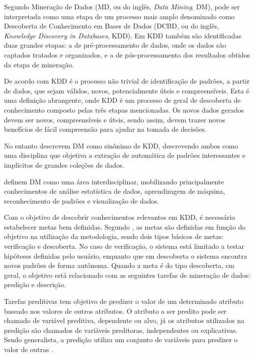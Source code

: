 Segundo  Mineração de Dados (MD, ou do inglês,
\textit{Data Mining}, DM), pode ser interpretada como uma etapa de um processo
mais amplo denominado como Descoberta de Conhecimento em Bases de Dados (DCBD,
ou do inglês, \textit{Knowledge Discovery in Databases}, KDD). Em KDD também são
identificadas duas grandes etapas: a de pré-processamento de dados, onde os
dados são captados tratados e organizados, e a de pós-processamento dos
resultados obtidos da etapa de mineração.

De acordo com  KDD é o processo não trivial de
identificação de padrões, a partir de dados, que sejam válidos, novos,
potencialmente úteis e compreensíveis. Esta é uma definição abrangente, onde KDD
é um processo de geral de descoberta de conhecimento composto pelas três etapas
mencionadas. Os novos dados gerados devem ser novos, compreensíveis e úteis,
sendo assim, devem trazer novos benefícios de fácil compreensão para ajudar na
tomada de decisões.

No entanto  descrevem DM como sinônimo de KDD,
descrevendo ambos como uma disciplina que objetiva a extração de automática de
padrões interessantes e implícitos de grandes coleções de dados.

 definem DM como uma área interdisciplinar,
mobilizando principalmente conhecimentos de análise estatística de dados,
aprendizagem de máquina, reconhecimento de padrões e visualização de dados.

Com o objetivo de descobrir conhecimentos relevantes em KDD, é necessário
estabelecer metas bem definidas. Segundo , as metas
são definidas em função do objetivo na utilização da metodologia, sendo dois
tipos básicos de metas: verificação e descoberta. No caso de verificação, o
sistema está limitado a testar hipóteses definidas pelo usuário, enquanto que em
descoberta o sistema encontra novos padrões de forma autônoma. Quando a meta é
do tipo descoberta, em geral, o objetivo está relacionado com as seguintes
tarefas de mineração de dados: predição e descrição.

Tarefas preditivas tem objetivo de predizer o valor de um determinado atributo
baseado nos valores de outros atributos. O atributo a ser predito pode ser
chamado de variável preditiva, dependente ou alvo, já os atributos utilizados na
predição são chamados de variáveis preditoras, independentes ou explicativas.
Sendo generalista, a predição utiliza um conjunto de variáveis para predizer o
valor de outras \cite{fayyad1996data}.

